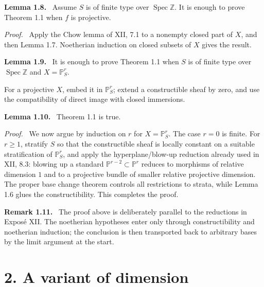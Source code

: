 \documentclass[12pt]{article}
\newcommand{\Zz}{\mathbb{Z}}
\newcommand{\Spec}{\operatorname{Spec}}
\newenvironment{statement}[1]{\par\medskip\noindent\textbf{#1.}\ }{\par\medskip}
\newenvironment{remarktext}[1]{\par\medskip\noindent\textbf{#1.}\ }{\par\medskip}
\newenvironment{prooftext}[1][Proof]{\par\noindent\emph{#1.}\ }{\par\medskip}
\begin{document}
\begin{statement}{Lemma 1.8}
Assume \(S\) is of finite type over \(\Spec\Zz\). It is enough to prove Theorem 1.1 when \(f\) is projective.
\end{statement}

\begin{prooftext}
Apply the Chow lemma of XII, 7.1 to a nonempty closed part of \(X\), and then Lemma 1.7. Noetherian induction on closed subsets of \(X\) gives the result.
\end{prooftext}

\begin{statement}{Lemma 1.9}
It is enough to prove Theorem 1.1 when \(S\) is of finite type over \(\Spec\Zz\) and \(X=\mathbb P^r_S\).
\end{statement}

For a projective \(X\), embed it in \(\mathbb P^r_S\); extend a constructible sheaf by zero, and use the compatibility of direct image with closed immersions.

\begin{statement}{Lemma 1.10}
Theorem 1.1 is true.
\end{statement}

\begin{prooftext}
We now argue by induction on \(r\) for \(X=\mathbb P^r_S\). The case \(r=0\) is finite. For \(r\ge1\), stratify \(S\) so that the constructible sheaf is locally constant on a suitable stratification of \(\mathbb P^r_S\), and apply the hyperplane/blow-up reduction already used in XII, 8.3: blowing up a standard \(\mathbb P^{r-2}\subset\mathbb P^r\) reduces to morphisms of relative dimension \(1\) and to a projective bundle of smaller relative projective dimension. The proper base change theorem controls all restrictions to strata, while Lemma 1.6 glues the constructibility. This completes the proof.
\end{prooftext}

\begin{remarktext}{Remark 1.11}
The proof above is deliberately parallel to the reductions in Expos\'e XII. The noetherian hypotheses enter only through constructibility and noetherian induction; the conclusion is then transported back to arbitrary bases by the limit argument at the start.
\end{remarktext}

\section*{2. A variant of dimension}
\end{document}
